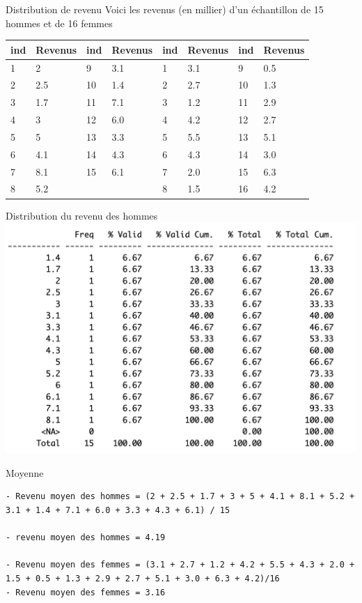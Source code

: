 \documentclass[
  ignorenonframetext,
]{beamer}
\begin{document}
\begin{frame}{Distribution de revenu}
\protect\hypertarget{distribution-de-revenu}{}
Voici les revenus (en millier) d'un échantillon de 15 hommes et de 16
femmes

\begin{longtable}[]{@{}llllllll@{}}
\toprule()
ind & Revenus & ind & Revenus & ind & Revenus & ind & Revenus \\
\midrule()
\endhead
1 & 2 & 9 & 3.1 & 1 & 3.1 & 9 & 0.5 \\
2 & 2.5 & 10 & 1.4 & 2 & 2.7 & 10 & 1.3 \\
3 & 1.7 & 11 & 7.1 & 3 & 1.2 & 11 & 2.9 \\
4 & 3 & 12 & 6.0 & 4 & 4.2 & 12 & 2.7 \\
5 & 5 & 13 & 3.3 & 5 & 5.5 & 13 & 5.1 \\
6 & 4.1 & 14 & 4.3 & 6 & 4.3 & 14 & 3.0 \\
7 & 8.1 & 15 & 6.1 & 7 & 2.0 & 15 & 6.3 \\
8 & 5.2 & & & 8 & 1.5 & 16 & 4.2 \\
\bottomrule()
\end{longtable}
\end{frame}

\begin{frame}{Distribution du revenu des hommes}
\protect\hypertarget{distribution-du-revenu-des-hommes}{}
\includegraphics{../../Images/cours4.1.png}
\end{frame}

\begin{frame}[fragile]{Moyenne}
\protect\hypertarget{moyenne}{}
\begin{verbatim}
- Revenu moyen des hommes = (2 + 2.5 + 1.7 + 3 + 5 + 4.1 + 8.1 + 5.2 + 3.1 + 1.4 + 7.1 + 6.0 + 3.3 + 4.3 + 6.1) / 15

- revenu moyen des hommes = 4.19

- Revenu moyen des femmes = (3.1 + 2.7 + 1.2 + 4.2 + 5.5 + 4.3 + 2.0 + 1.5 + 0.5 + 1.3 + 2.9 + 2.7 + 5.1 + 3.0 + 6.3 + 4.2)/16
- Revenu moyen des femmes = 3.16
\end{verbatim}
\end{frame}
\end{document}
